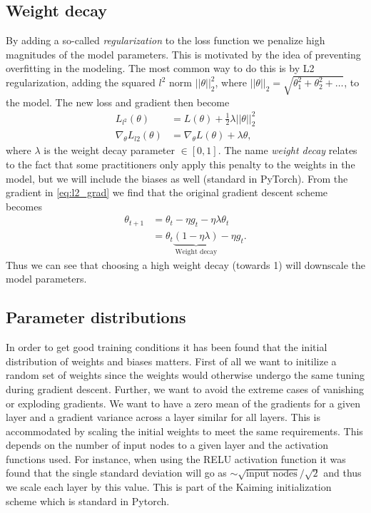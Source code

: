 \subsection{Weight decay}
By adding a so-called \textit{regularization} to the loss function we penalize high magnitudes of the model parameters. This is motivated by the idea of preventing overfitting in the modeling. The most common way to do this is by L2 regularization, adding the squared $l^2$ norm $||\theta||_2^2$, where $||\theta||_2 = \sqrt{\theta_1^2 + \theta_2^2 + \ldots}$, to the model. The new loss and gradient then become
\begin{align}
  L_{l^2}(\theta) &= L(\theta) + \frac{1}{2}\lambda ||\theta||^2_2 \nonumber \\
  \nabla_\theta L_{l2}(\theta) &=  \nabla_\theta L(\theta) + \lambda \theta,
  \label{eq:l2_grad}
\end{align}
where $\lambda$ is the weight decay parameter $\in [0,1]$. The name \textit{weight decay} relates to the fact that some practitioners only apply this penalty to the weights in the model, but we will include the biases as well (standard in PyTorch). From the gradient in \cref{eq:l2_grad} we find that the original gradient descent scheme becomes
\begin{align*}
  \theta_{t+1} &= \theta_t - \eta g_t - \eta\lambda \theta_t \\
  &= \theta_t\underbrace{(1-\eta\lambda)}_{\text{Weight decay}} - \eta g_t.
\end{align*}
Thus we can see that choosing a high weight decay (towards 1) will downscale the model parameters.  

\subsection{Parameter distributions}
In order to get good training conditions it has been found that the initial distribution of weights and biases matters. First of all we want to initilize a random set of weights since the weights would otherwise undergo the same tuning during gradient descent. Further, we want to avoid the extreme cases of vanishing or exploding gradients. We want to have a zero mean of the gradients for a given layer and a gradient variance across a layer similar for all layers. This is accommodated by scaling the initial weights to meet the same requirements. This depends on the number of input nodes to a given layer and the activation functions used. For instance, when using the RELU activation function it was found that the single standard deviation will go as $\sim \sqrt{\text{input nodes}}/\sqrt{2}$ and thus we scale each layer by this value. This is part of the Kaiming initialization scheme which is standard in Pytorch. 


